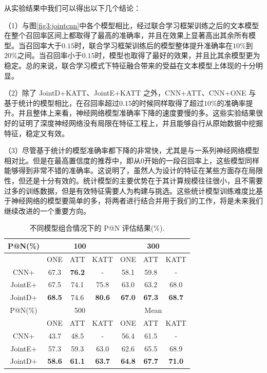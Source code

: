 从实验结果中我们可以得出以下几个结论：

（1）与图\ref{fig3:jointcnn}中各个模型相比，经过联合学习框架训练之后的文本模型在整个召回率区间上都取得了最高的准确率，并且在效果上显著高出其余所有模型。当召回率大于$0.15$时，联合学习框架训练后的模型整体提升准确率在$10\%$到$20\%$之间。当召回率小于$0.15$时，模型也取得了最好的效果，并且比其余模型更为稳定。总的来说，联合学习模式下特征融合带来的受益在文本模型上体现的十分明显。

（2）除了 JointD+KATT、JointE+KATT 之外，CNN+ATT、CNN+ONE 与基于统计的模型相比，在召回率超过$0.15$的时候同样取得了超过$10\%$的准确率提升。并且整体上来看，神经网络模型准确率下降的速度要慢的多。这些实验结果很好的证明了深度神经网络没有局限在特征工程上，并且能够自行从原始数据中挖掘特征，稳定又有效。

（3）尽管基于统计的模型准确率都下降的非常快，尤其是与一系列神经网络模型相对比。但是在最高置信度的推荐中，即从$0$开始的一段召回率上，这些模型同样能够得到非常不错的准确率。这说明了，虽然人为设计的特征在某些方面存在局限性，但还是十分有效的。统计模型的主要优势在于其计算规模往往很小，且不需要过多的训练数据，但是有效特征需要人为构建与挑选。这些统计模型训练难度比基于神经网络的模型要简单的多，将两者进行结合并用于我们的工作，将是未来我们继续改进的一个重要方向。

\vspace{25pt}
\begin{table}[h]
\setlength{\abovecaptionskip}{30pt} 
\centering
\caption{不同模型组合情况下的 P@N 评估结果(\%).}
\begin{tabular}{|c|ccc|ccc|} 
\hline
P@N(\%) & \multicolumn{3}{c|}{100}                                      & \multicolumn{3}{c|}{300} \\ \hline
& \multicolumn{1}{c|}{ONE} & \multicolumn{1}{c|}{ATT} & KATT & \multicolumn{1}{c|}{ONE} & \multicolumn{1}{c|}{ATT} & KATT \\ \hline
CNN+	& 67.3	& \textbf{76.2}	& -     & 58.1	& 59.8 	& -    \\ \cline{1-1}
JointE+  & 67.5 	& 74.1	& 75.8  & 63.0 	& 63.2 	& 68.0  \\ \cline{1-1}  
JointD+  & \textbf{68.5}    & 74.6  & \textbf{80.6}  & \textbf{67.0} & \textbf{67.3} & \textbf{68.7}  \\ \hline
P@N(\%) & \multicolumn{3}{c|}{500}                                      & \multicolumn{3}{c|}{Mean} \\ \hline 
& \multicolumn{1}{c|}{ONE} & \multicolumn{1}{c|}{ATT} & KATT & \multicolumn{1}{c|}{ONE} & \multicolumn{1}{c|}{ATT} & KATT \\ \hline
CNN+	& 43.7	& 48.5			& -     & 56.4 	& 61.5 	& -     \\ \cline{1-1}
JointE+  & 57.3 	& 59.3 	& 63.0  & 62.6 	& 65.5  & 68.9  \\ \cline{1-1}
JointD+  & \textbf{58.6}    & \textbf{61.1}  & \textbf{63.7}  & \textbf{64.8}   & \textbf{67.7}    & \textbf{71.0}  \\ \hline
\end{tabular}
\label{tab3:relationExt}
\end{table}


